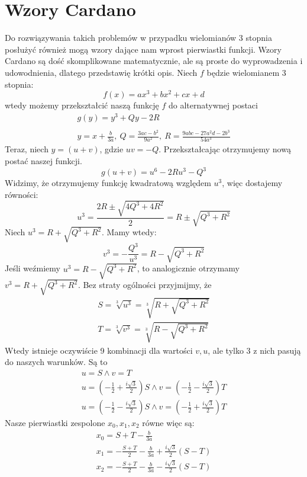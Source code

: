 \documentclass[a4paper]{article}
\begin{document}
\section{Wzory Cardano}
    Do rozwiązywania takich problemów w przypadku wielomianów 3 stopnia posłużyć również mogą wzory dające nam wprost
    pierwiastki funkcji. Wzory Cardano są dość skomplikowane matematycznie, ale są proste do wyprowadzenia i udowodnienia,
    dlatego przedstawię krótki opis. Niech $f$ będzie wielomianem 3 stopnia:
    \[
        f(x) = ax^3 + bx^2 + cx + d
    \]
    wtedy możemy przekształcić naszą funkcję $f$ do alternatywnej postaci
    \[
        \begin{array}{c}
            g(y) = y^3 + Qy - 2R \\ \\
            y = x + \frac{b}{3a }, \ Q = \frac{3ac - b^2}{9a^2}, \ R = \frac{9abc - 27a^2d - 2b^3}{54a^3} 
        \end{array}
    \]
    Teraz, niech $y = (u + v)$, gdzie $uv = -Q$. Przekształcając otrzymujemy nową postać naszej funkcji.
    \[
        g(u + v) = u^6 - 2Ru^3 - Q^3
    \]
    Widzimy, że otrzymujemy funkcję kwadratową względem $u^3$, więc dostajemy równości:
    \[
        u^3 = \frac{2R \pm \sqrt{4Q^3 + 4R^2}}{2} = R \pm \sqrt{Q^3 + R^2}
    \]
    Niech $u^3 = R + \sqrt{Q^3 + R^2}$. Mamy wtedy:
    \[
        v^3 = -\frac{Q^3}{u^3} = R - \sqrt{Q^3 + R^2}
    \]
    Jeśli weźmiemy $u^3 = R - \sqrt{Q^3 + R^2}$, to analogicznie otrzymamy $v^3 = R + \sqrt{Q^3 + R^2}$. 
    Bez straty ogólności przyjmijmy, że
    \[
        \begin{array}{c}
            S = \sqrt[3]{u^3} = \sqrt[3]{R + \sqrt{Q^3 + R^2}} \\
            T = \sqrt[3]{v^3} = \sqrt[3]{R - \sqrt{Q^3 + R^2}}
        \end{array}
    \]
    Wtedy istnieje oczywiście 9 kombinacji dla wartości $v, u$, ale tylko 3 z nich pasują do naszych
    warunków. Są to 
    \[
        \begin{array}{c}
            u = S \land v = T \\
            u = (-\frac{1}{2} + \frac{i\sqrt{3}}{2})S \land v = (-\frac{1}{2} - \frac{i\sqrt{3}}{2})T \\
            u = (-\frac{1}{2} - \frac{i\sqrt{3}}{2})S \land v = (-\frac{1}{2} + \frac{i\sqrt{3}}{2})T
        \end{array}
    \]
    Nasze pierwiastki zespolone $x_0, x_1, x_2$ równe więc są:
    \[
        \begin{array}{c}
            x_0 = S + T - \frac{b}{3a} \\
            x_1 = -\frac{S + T}{2} - \frac{b}{3a} + \frac{i\sqrt{3}}{2}(S - T) \\
            x_2 = -\frac{S + T}{2} - \frac{b}{3a} - \frac{i\sqrt{3}}{2}(S - T)
        \end{array}
    \]
\end{document}
